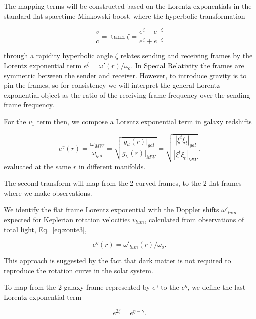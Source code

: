 \documentclass[reprint,%
 amsmath,amssymb,
 aps,
]{revtex4-1}
\begin{document}
 The mapping terms will be constructed based on the 
 Lorentz exponentials in the   standard flat spacetime  Minkowski boost, 
 where   the  hyperbolic  transformation  

     \begin{equation}
         \frac{v}{c} = \tanh \zeta = \frac{e^\zeta - e^{-\zeta}}{e^\zeta + e^{-\zeta}}   
         \label{boost}
     \end{equation} 

 through a rapidity hyperbolic angle $\zeta$ relates sending and receiving frames by  the
    Lorentz exponential term  $e^\zeta = \omega'(r) /\omega_o$. In Special Relativity the frames are   symmetric between the sender and receiver. However, to introduce gravity is to pin the frames, so for consistency we will interpret the general Lorentz exponential object as the ratio of the receiving frame frequency over the   sending frame frequency.  
 
For the $v_1$ term then, we compose a   Lorentz exponential term  in galaxy redshifts
 
     \begin{equation}
     e^{\gamma}(r)=  \frac{\omega_{MW}}{\omega_{gal}}  =\sqrt{\frac{g_{tt}(r)|_{gal}}{g_{tt}(r)|_{MW}}} =\sqrt{\frac{|\xi^t\xi_{t}|_{gal}}{|\xi^t\xi_{t}|_{MW}}}. 
      \label{eq:gravRS}
    \end{equation}
 evaluated at the same $r$ in different manifolds. 
   
 
The  second transform will map  from the 2-curved frames, to the 2-flat frames  where we make observations.

We identify the flat frame Lorentz exponential with the Doppler shifts $\omega'_{lum}$ expected for      Keplerian rotation velocities $v_{lum}$,   calculated from  observations of total light, Eq.~\ref{eq:zonte3},

\begin{equation}
    e^{\eta}(r)=\omega'_{lum}(r)/\omega_o.  
    \label{eq:flat}
  \end{equation} 
  
 This approach is suggested by   the fact that dark matter is not required to reproduce the rotation curve in the  solar system.  


To map from the  2-galaxy frame represented by $ e^{\gamma}$ to the $ e^{\eta}$, we define the last   Lorentz exponential term
 

\begin{equation}
    e^{2\xi}=   e^{\eta-\gamma}  .
\end{equation}
\end{document}
